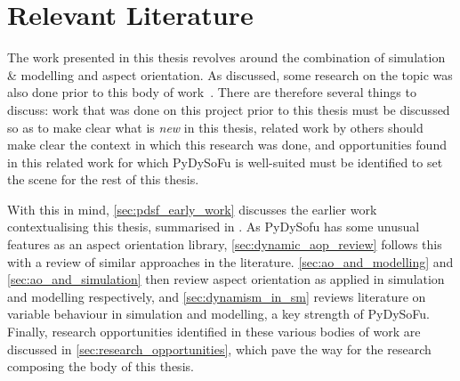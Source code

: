 \chapter{Relevant Literature}

The work presented in this thesis revolves around the combination of simulation
\& modelling and aspect orientation. As discussed, some research on the topic
was also done prior to this body of work~. There are therefore several things to discuss: work that
was done on this project prior to this thesis must be discussed so as to make
clear what is \emph{new} in this thesis, related work by others should make
clear the context in which this research was done, and opportunities found in
this related work for which PyDySoFu is well-suited must be identified to set
the scene for the rest of this thesis.

With this in mind, \cref{sec:pdsf_early_work} discusses the earlier work contextualising this
thesis, summarised in \cite{wallis2018caise}. As PyDySofu has some unusual
features as an aspect orientation library, \cref{sec:dynamic_aop_review} follows
this with a review of similar approaches in the literature.
\cref{sec:ao_and_modelling} and \cref{sec:ao_and_simulation} then review aspect
orientation as applied in simulation and modelling respectively, and
\cref{sec:dynamism_in_sm} reviews literature on variable behaviour in simulation
and modelling, a key strength of PyDySoFu. Finally, research opportunities
identified in these various bodies of work are discussed in
\cref{sec:research_opportunities}, which pave the way for the research composing
the body of this thesis.















